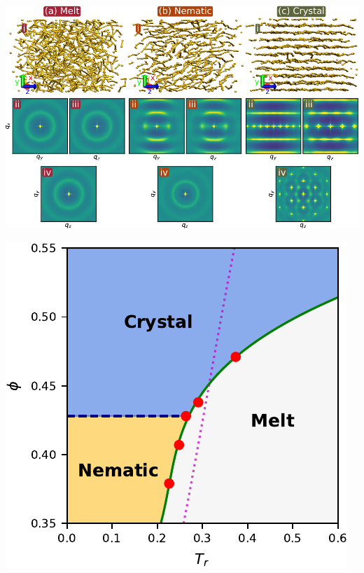 \documentclass[aspectratio=169]{beamer}
\begin{document}
\begin{frame}[c]{}

  \centering
  \includegraphics[height=\textheight]{../figures/ch4_jcp_from_diss/fig-confs_plus_structs/fig-confs_plus_structs.pdf}

\end{frame}

\begin{frame}[c]{}

  \centering
  \includegraphics[height=\textheight]{../figures/ch4_jcp_from_diss/fig-phase_diag/fig-phase_diag.pdf}

\end{frame}
\end{document}
